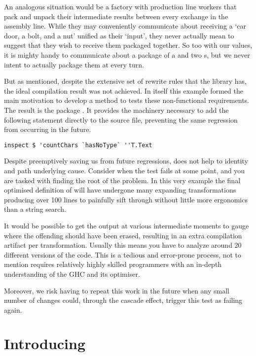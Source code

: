 An analogous situation would be a factory with production line workers that
pack and unpack their intermediate results between every exchange in the assembly line. While they may
conveniently communicate about receiving a `car door, a bolt, and a nut' unified as their `input', they
never actually mean to suggest that they wish to receive them packaged together. So too with our  values,
it is mighty handy to communicate about a package of a  and two s, but we never intent to
actually package them at every turn.

But as mentioned, despite the extensive set of rewrite rules that the  library has, the
ideal compilation result was not achieved. In itself this example formed the main motivation to 
develop a method to tests these non-functional requirements.
The result is the  package \cite{inspection_testing}. 
It provides the machinery necessary to add the following statement
directly to the source file, preventing the same regression from occurring in the future.

\begin{verbatim}
inspect $ 'countChars `hasNoType` ''T.Text
\end{verbatim}

Despite preemptively saving us from future regressions,  does not help to
identity and path underlying cause. Consider when the test fails at
some point, and you are tasked with finding the root of the problem. In this very example the final 
optimised definition of  will have undergone many expanding transformations producing 
over 100 lines to painfully sift through without little more ergonomics than a string search. 

It would be possible to get the output at various intermediate moments to gauge where the 
offending  should have been erased, resulting in an extra compilation artifact per transformation.
Usually this means you have to analyze around 20 different versions of the code. 
This is a tedious and error-prone process, not to mention requires relatively highly skilled programmers
with an in-depth understanding of the GHC and its optimiser. 

Moreover, we risk having to repeat this work in the future when any small number of changes
could, through the cascade effect, trigger this test as failing again.

\section{Introducing }

